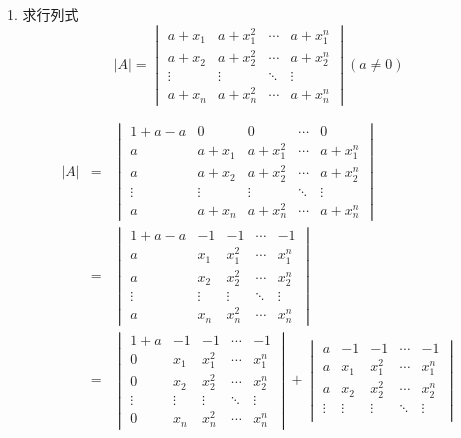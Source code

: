 1. 求行列式 
$$|A| = 
\begin{vmatrix}
	a+x_{1} & a+x_{1}^{2} & \cdots & a+x_{1}^n \\
	a+x_{2} & a+x_{2}^{2} & \cdots & a+x_{2}^n \\
	\vdots  & \vdots      & \ddots & \vdots \\
	a+x_{n} & a+x_{n}^2   & \cdots & a+x_{n}^n
\end{vmatrix}(a\neq 0)$$
\begin{solution}
	\begin{eqnarray*}
		|A| & = & 
		\begin{vmatrix}
			1+a-a  & 0       & 0         & \cdots & 0 \\
			a      & a+x_{1} & a+x_{1}^2 & \cdots & a+x_{1}^n\\
			a      & a+x_{2} & a+x_{2}^2 & \cdots & a+x_{2}^n\\
			\vdots & \vdots  & \vdots    & \ddots & \vdots\\
			a      & a+x_{n} & a+x_{n}^2 & \cdots & a+x_{n}^n
		\end{vmatrix}\\
		    & =& 
		\begin{vmatrix}
			1+a-a  & -1     & -1      & \cdots & -1 \\
			a      & x_{1}  & x_{1}^2 & \cdots & x_{1}^n \\
			a      & x_{2}  & x_{2}^2 & \cdots & x_{2}^n\\
			\vdots & \vdots & \vdots  & \ddots & \vdots\\
			a      & x_{n}  & x_{n}^2 & \cdots & x_{n}^n
		\end{vmatrix}\\
		    & = & 
		\begin{vmatrix}
			1+a    & -1     & -1      & \cdots & -1\\
			0      & x_{1}  & x_{1}^2 & \cdots & x_{1}^n\\
			0      & x_{2}  & x_{2}^2 & \cdots & x_{2}^n\\
			\vdots & \vdots & \vdots  & \ddots & \vdots\\
			0      & x_{n}  & x_{n}^2 & \cdots & x_{n}^n
		\end{vmatrix} + 
		\begin{vmatrix}
			a      & -1     & -1      & \cdots & -1 \\
			a      & x_{1}  & x_{1}^2 & \cdots & x_{1}^n \\
			a      & x_{2}  & x_{2}^2 & \cdots & x_{2}^n \\
			\vdots & \vdots & \vdots  & \ddots & \vdots \\

\end{vmatrix}
\end{eqnarray*}
\end{solution}
